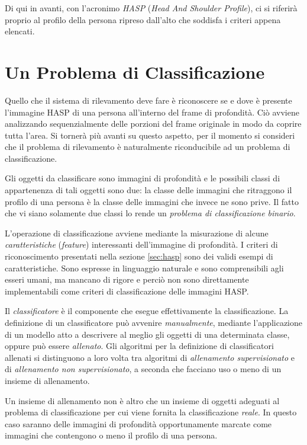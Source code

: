 Di qui in avanti, con l'acronimo \emph{HASP} (\emph{Head And Shoulder Profile}), ci si riferirà proprio al profilo della persona ripreso dall'alto che soddisfa i criteri appena elencati.


\section{Un Problema di Classificazione}
\label{sec:classification_problem}
Quello che il sistema di rilevamento deve fare è riconoscere se e dove è presente l'immagine HASP di una persona all'interno del frame di profondità.
Ciò avviene analizzando sequenzialmente delle porzioni del frame originale in modo da coprire tutta l'area. Si tornerà più avanti su questo aspetto, per il momento si consideri che il problema di rilevamento è naturalmente riconducibile ad un problema di classificazione.

Gli oggetti da classificare sono immagini di profondità e le possibili classi di appartenenza di tali oggetti sono due: la classe delle immagini che ritraggono il profilo di una persona è la classe delle immagini che invece ne sono prive.
Il fatto che vi siano solamente due classi lo rende un \emph{problema di classificazione binario}.

L'operazione di classificazione avviene mediante la misurazione di alcune \emph{caratteristiche} (\emph{feature}) interessanti dell'immagine di profondità.
I criteri di riconoscimento presentati nella sezione \ref{sec:hasp} sono dei validi esempi di caratteristiche. Sono espresse in linguaggio naturale e sono comprensibili agli esseri umani, ma mancano di rigore e perciò non sono direttamente implementabili come criteri di classificazione delle immagini HASP.

Il \emph{classificatore} è il componente che esegue effettivamente la classificazione. La definizione di un classificatore può avvenire \emph{manualmente}, mediante l'applicazione di un modello atto a descrivere al meglio gli oggetti di una determinata classe, oppure può essere \emph{allenato}.
Gli algoritmi per la definizione di classificatori allenati si distinguono a loro volta tra algoritmi di \emph{allenamento supervisionato} e di \emph{allenamento non supervisionato}, a seconda che facciano uso o meno di un insieme di allenamento.

Un insieme di allenamento non è altro che un insieme di oggetti adeguati al problema di classificazione per cui viene fornita la classificazione \emph{reale}.
In questo caso saranno delle immagini di profondità opportunamente marcate come immagini che contengono o meno il profilo di una persona.

